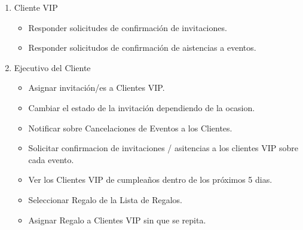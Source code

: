 \begin{enumerate}
	\item Cliente VIP
	\begin{itemize}
		\item Responder solicitudes de confirmaci\'on de invitaciones.
		\item Responder solicitudos de confirmaci\'on de aistencias a eventos.
	\end{itemize}
	\item Ejecutivo del Cliente
	\begin{itemize}	
		\item Asignar invitaci\'on/es a Clientes VIP.
		\item Cambiar el estado de la invitaci\'on dependiendo de la ocasion.
		\item Notificar sobre Cancelaciones de Eventos a los Clientes.
		\item Solicitar confirmacion de invitaciones / asitencias a los clientes VIP sobre cada evento.
		\item Ver los Clientes VIP de cumplea\~nos dentro de los pr\'oximos 5 dias.
		\item Seleccionar Regalo de la Lista de Regalos.
		\item Asignar Regalo a Clientes VIP sin que se repita.


\end{itemize}
\end{enumerate}
